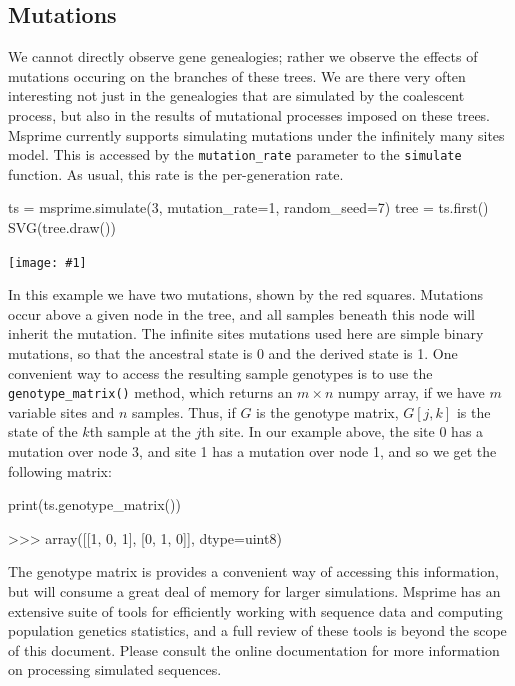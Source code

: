 \documentclass[graybox]{svmult}
\newcommand{\includenbimage}[1]{\begin{center}\texttt{[image: \#1]}\end{center}}
\begin{document}
    \subsection{Mutations}\label{mutations}

We cannot directly observe gene genealogies; rather we observe the
effects of mutations occuring on the branches of these trees. We are
there very often interesting not just in the genealogies that are
simulated by the coalescent process, but also in the results of
mutational processes imposed on these trees. Msprime currently supports
simulating mutations under the infinitely many sites model. This is
accessed by the \texttt{mutation\_rate} parameter to the
\texttt{simulate} function. As usual, this rate is the per-generation
rate.

\begin{pythoncode}
ts = msprime.simulate(3, mutation_rate=1, random_seed=7)
tree = ts.first()
SVG(tree.draw())
\end{pythoncode}
\includenbimage{images/simulations_19_0.pdf}

    In this example we have two mutations, shown by the red squares.
Mutations occur above a given node in the tree, and all samples beneath
this node will inherit the mutation. The infinite sites mutations used
here are simple binary mutations, so that the ancestral state is 0 and
the derived state is 1. One convenient way to access the resulting
sample genotypes is to use the \texttt{genotype\_matrix()} method, which
returns an \(m \times n\) numpy array, if we have \(m\) variable sites
and \(n\) samples. Thus, if \(G\) is the genotype matrix, \(G[j, k]\) is
the state of the \(k\)th sample at the \(j\)th site. In our example
above, the site 0 has a mutation over node 3, and site 1 has a mutation
over node 1, and so we get the following matrix:

\begin{pythoncode}
print(ts.genotype_matrix())

>>> array([[1, 0, 1],
           [0, 1, 0]], dtype=uint8)
\end{pythoncode}

    The genotype matrix is provides a convenient way of accessing this
information, but will consume a great deal of memory for larger
simulations. Msprime has an extensive suite of tools for efficiently
working with sequence data and computing population genetics statistics,
and a full review of these tools is beyond the scope of this document.
Please consult the online documentation for more information on
processing simulated sequences.
\end{document}
